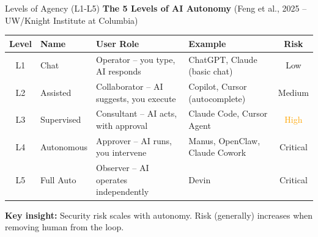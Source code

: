 \documentclass[aspectratio=169,9pt]{beamer}
\begin{document}
\begin{frame}{Levels of Agency (L1-L5)}
\textbf{The 5 Levels of AI Autonomy} {\small (Feng et al., 2025 -- UW/Knight Institute at Columbia)}

\vspace{0.3em}
\small
\begin{tabular}{c|l|l|l|c}
\toprule
\textbf{Level} & \textbf{Name} & \textbf{User Role} & \textbf{Example} & \textbf{Risk} \\
\midrule
L1 & Chat & Operator -- you type, AI responds & ChatGPT, Claude (basic chat) & \textcolor{partgreen}{Low} \\
L2 & Assisted & Collaborator -- AI suggests, you execute & Copilot, Cursor (autocomplete) & \textcolor{yellow!80!black}{Medium} \\
L3 & Supervised & Consultant -- AI acts, with approval & Claude Code, Cursor Agent & \textcolor{orange}{High} \\
L4 & Autonomous & Approver -- AI runs, you intervene & Manus, OpenClaw, Claude Cowork & \textcolor{partred}{Critical} \\
L5 & Full Auto & Observer -- AI operates independently & Devin & \textcolor{partred}{Critical} \\
\bottomrule
\end{tabular}

\vspace{0.8em}
\begin{center}
\end{center}

\begin{graybox}
\textbf{Key insight:} Security risk scales with autonomy. Risk (generally) increases when removing human from the loop.
\end{graybox}
\end{frame}
\end{document}
